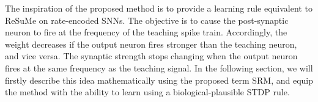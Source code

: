 The inspiration of the proposed method is to provide a learning rule equivalent to ReSuMe on rate-encoded SNNs.
The objective is to cause the post-synaptic neuron to fire at the frequency of the teaching spike train. 
Accordingly, the weight decreases if the output neuron fires stronger than the teaching neuron, and vice versa.
The synaptic strength stops changing when the output neuron fires at the same frequency as the teaching signal.
In the following section, we will firstly describe this idea mathematically using the proposed term SRM, and equip the method with the ability to learn using a biological-plausible STDP rule.
 

